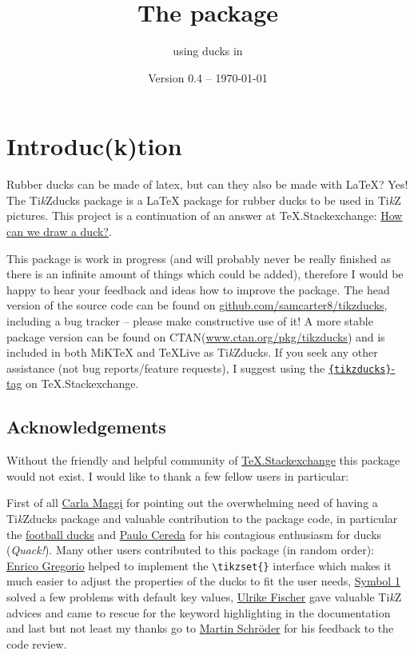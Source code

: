 \documentclass[parskip=half]{scrartcl}
\title{The \texorpdfstring{\tikzducks}{tikzducks} package}
\subtitle{using ducks in \TikZ}
\author{%
	\texorpdfstring{\texttt{samcarter} (alias 
		\begin{tikzpicture}[scale=0.3,baseline=3pt]
			\duck[body=yellow!50!brown!50!white,
					longhair=red!50!brown, 
					jacket=blue!50!black]
		\end{tikzpicture})\\[0.8em]
		\url{https://github.com/samcarter8/tikzducks}\\
		\url{https://www.ctan.org/pkg/tikzducks}
	}{samcarter}}
\date{Version 0.4 -- \today}
\newcommand{\CTAN}{\textsc{CTAN}\xspace}
\newcommand{\TikZ}{Ti\emph{k}Z\xspace}
\newcommand{\tikzducks}{Ti\emph{k}Zducks\xspace}
\newcommand{\miktex}{MiK\TeX\xspace}
\newcommand{\texlive}{\TeX{}Live\xspace}
\begin{document}
\maketitle
\thispagestyle{scrheadings}

\section{Introduc(k)tion}
\label{intro}

Rubber ducks can be made of latex, but can they also be made with \LaTeX? Yes! The \tikzducks package is a \LaTeX{} package for rubber ducks to be used in \TikZ pictures. 
This project is a continuation of an answer at TeX.Stackexchange: \href{tex.stackexchange.com/a/347458/36296}{How can we draw a duck?}.

This package is work in progress (and will probably never be really finished as there is an infinite amount of things which could be added), therefore I would be happy to hear your feedback and ideas how to improve the package. 
The head version of the source code can be found on \url{github.com/samcarter8/tikzducks}, including a bug tracker -- please make constructive use of it! A more stable package version can be found on \CTAN (\url{www.ctan.org/pkg/tikzducks}) and is included in both \miktex and \texlive as \tikzducks. If you seek any other assistance (not bug reports/feature requests), I suggest using the \href{https://tex.stackexchange.com/questions/tagged/tikzducks}{\texttt{\{tikzducks\}}-tag} on TeX.Stackexchange.

\subsection{Acknowledgements}

Without the friendly and helpful community of \href{https://tex.stackexchange.com/}{TeX.Stackexchange} this package would not exist. I would like to thank a few fellow users in particular:

First of all \href{https://tex.stackexchange.com/users/101651/carlatex}{Carla Maggi} for pointing out the overwhelming need of having a \tikzducks package and valuable contribution to the package code, in particular the \hyperref[sec:footballducks]{football ducks} and \href{https://tex.stackexchange.com/users/3094/paulo-cereda}{Paulo Cereda} for his contagious enthusiasm for ducks (\emph{Quack!}). Many other users contributed to this package (in random order): \href{https://tex.stackexchange.com/users/4427/egreg}{Enrico Gregorio} helped to implement the \lstinline|\tikzset{}| interface which makes it much easier to adjust the properties of the ducks to fit the user needs, \href{https://tex.stackexchange.com/users/51022/symbol-1}{Symbol 1}  solved a few problems with default key values, \href{https://tex.stackexchange.com/users/2388/ulrike-fischer}{Ulrike Fischer} gave valuable \TikZ advices and came to rescue for the keyword highlighting in the documentation and last but not least my thanks go to \href{https://tex.stackexchange.com/users/5763/martin-schr%c3%b6der}{Martin Schr\"oder} for his feedback to the code review.
\end{document}
